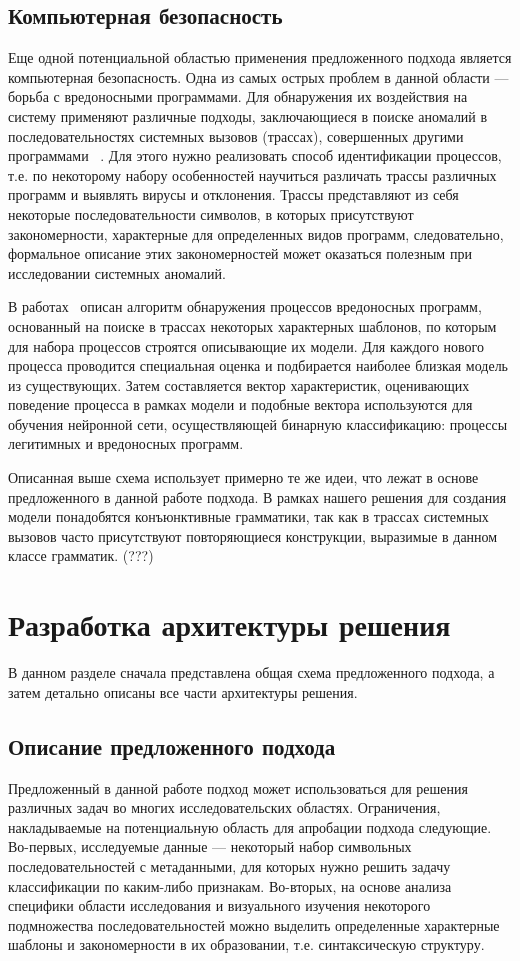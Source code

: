 \documentclass[14pt]{matmex-diploma-custom}
\begin{document}
\subsection{Компьютерная безопасность}
Еще одной потенциальной областью применения предложенного подхода является компьютерная безопасность. Одна из самых острых проблем в данной области --- борьба с вредоносными программами. Для обнаружения их воздействия на систему применяют различные подходы, заключающиеся в поиске аномалий в последовательностях системных вызовов (трассах), совершенных другими программами ~\cite{hofmeyr1998intrusion,wespi2000intrusion,ghosh1999study}. Для этого нужно реализовать способ идентификации процессов, т.е. по некоторому набору особенностей научиться различать трассы различных программ и выявлять вирусы и отклонения. Трассы представляют из себя некоторые последовательности символов, в которых присутствуют закономерности, характерные для определенных видов программ, следовательно, формальное описание этих закономерностей может оказаться полезным при исследовании системных аномалий.

В работах~\cite{баклановский2015поведенческая,баклановский2016оценка} описан алгоритм обнаружения процессов вредоносных программ, основанный на поиске в трассах некоторых характерных шаблонов, по которым для набора процессов строятся описывающие их модели. Для каждого нового процесса проводится специальная оценка и подбирается наиболее близкая модель из существующих. Затем составляется вектор характеристик, оценивающих поведение процесса в рамках модели и подобные вектора используются для обучения нейронной сети, осуществляющей бинарную классификацию: процессы легитимных и вредоносных программ.

Описанная выше схема использует примерно те же идеи, что лежат в основе предложенного в данной работе подхода. В рамках нашего решения для создания модели понадобятся конъюнктивные грамматики, так как в трассах системных вызовов часто присутствуют повторяющиеся конструкции, выразимые в данном классе грамматик. (???)

\section{Разработка архитектуры решения}
В данном разделе сначала представлена общая схема предложенного подхода, а затем детально описаны все части архитектуры решения. 
\subsection{Описание предложенного подхода}
Предложенный в данной работе подход может использоваться для решения различных задач во многих исследовательских областях. Ограничения, накладываемые на потенциальную область для апробации подхода следующие. Во-первых, исследуемые данные --- некоторый набор символьных последовательностей с метаданными, для которых нужно решить задачу классификации по каким-либо признакам. Во-вторых, на основе анализа специфики области исследования и визуального изучения некоторого подмножества последовательностей можно выделить определенные характерные шаблоны и закономерности в их образовании, т.е. синтаксическую структуру. 
\end{document}
